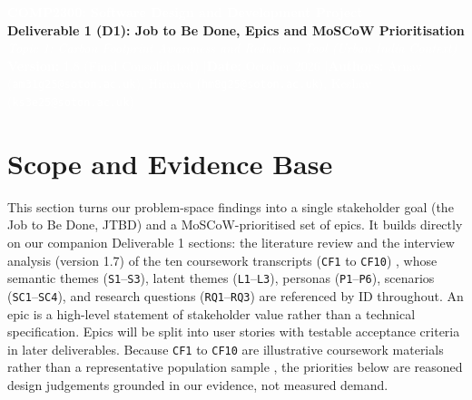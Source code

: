 \documentclass[12pt, a4paper]{article}
\begin{document}
\begin{tcolorbox}[enhanced, colback=cNavy, colframe=cNavy, arc=3pt, left=8pt, right=8pt, top=7pt, bottom=7pt]
\begin{center}
    {\Large\bfseries\textcolor{white}{COMP2300: Software Design and Development Project}}\\[0.2em]
    {\large\bfseries\textcolor{bgSand}{Deliverable 1 (D1): Job to Be Done, Epics and MoSCoW Prioritisation}}\\[0.15em]
    {\small\itshape\textcolor{white}{Topic 1: Carbon Footprint Awareness and Reduction Tool (Urban India Context)}}\\[0.35em]
    {\footnotesize\textcolor{white}{\textbf{Version:} 1.8 (Final Consolidated) \quad|\quad \textbf{Date:} October 2026 \quad|\quad \textbf{Authors:} Arnav (\texttt{am31g25@soton.ac.uk}), Hiranya (\texttt{hm8g25@soton.ac.uk}), Keshav (\texttt{ks3e25@soton.ac.uk})}}
\end{center}
\end{tcolorbox}

\section{Scope and Evidence Base}
This section turns our problem-space findings into a single stakeholder goal (the Job to Be Done, JTBD) and a MoSCoW-prioritised set of epics. It builds directly on our companion Deliverable 1 sections: the literature review \cite{lee2021,gandhi2025,grinstein2018,shi2021,mulrow2019,collins2020,hoffmann2024,lasarov2024,froehlich2010,mohanty2023,brynjarsdottir2012,froehlich2012,tiefenbeck2019} and the interview analysis (version 1.7) of the ten coursework transcripts (\texttt{CF1} to \texttt{CF10}) \cite{cf1,cf2,cf3,cf4,cf5,cf6,cf7,cf8,cf9,cf10}, whose semantic themes (\texttt{S1}--\texttt{S3}), latent themes (\texttt{L1}--\texttt{L3}), personas (\texttt{P1}--\texttt{P6}), scenarios (\texttt{SC1}--\texttt{SC4}), and research questions (\texttt{RQ1}--\texttt{RQ3}) are referenced by ID throughout. An epic is a high-level statement of stakeholder value rather than a technical specification. Epics will be split into user stories with testable acceptance criteria in later deliverables. Because \texttt{CF1} to \texttt{CF10} are illustrative coursework materials rather than a representative population sample \cite{cf1,cf10}, the priorities below are reasoned design judgements grounded in our evidence, not measured demand.
\end{document}
